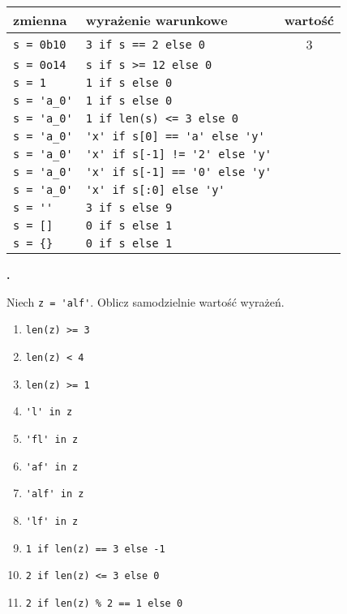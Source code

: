 \documentclass[a4paper]{article}
\begin{document}
\begin{tabular}{l|l|c}
\textsf{zmienna} & \textsf{wyrażenie warunkowe} & \textsf{wartość} \\\hline
\verb|s = 0b10| & \verb|3 if s == 2 else 0| & 3\\
\verb|s = 0o14| & \verb|s if s >= 12 else 0| &\\
\verb|s = 1| & \verb|1 if s else 0| &\\
\verb|s = 'a_0'| & \verb|1 if s else 0|&\\
\verb|s = 'a_0'| & \verb|1 if len(s) <= 3 else 0|&\\
\verb|s = 'a_0'| & \verb|'x' if s[0] == 'a' else 'y'|&\\
\verb|s = 'a_0'| & \verb|'x' if s[-1] != '2' else 'y'|&\\
\verb|s = 'a_0'| & \verb|'x' if s[-1] == '0' else 'y'|&\\
\verb|s = 'a_0'| & \verb|'x' if s[:0] else 'y'|&\\
\verb|s = ''| & \verb|3 if s else 9|&\\
\verb|s = []| & \verb|0 if s else 1|&\\
\verb|s = {}| & \verb|0 if s else 1|&\\
\end{tabular}
\newline


\textbf{.}\addtocounter{zadanie}{1} Niech \verb|z = 'alf'|. Oblicz samodzielnie wartość wyrażeń.

\begin{multicols}{2}
\begin{enumerate}[label=\arabic*.]
    \item \verb|len(z) >= 3|
    \item \verb|len(z) < 4|
    \item \verb|len(z) >= 1|
    \item \verb|'l' in z|
    \item \verb|'fl' in z|
    \item \verb|'af' in z|
    \item \verb|'alf' in z|
    \item \verb|'lf' in z|
    \item \verb|1 if len(z) == 3 else -1|
    \item \verb|2 if len(z) <= 3 else 0|
    \item \verb|2 if len(z) % 2 == 1 else 0|

\end{enumerate}
\end{multicols}
\end{document}
